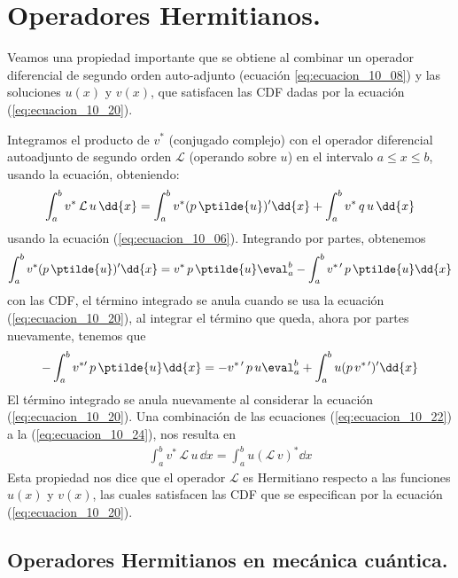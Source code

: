 \section{Operadores Hermitianos.}
Veamos una propiedad importante que se obtiene al combinar un operador diferencial de segundo orden auto-adjunto (ecuación \ref{eq:ecuacion_10_08}) y las soluciones $u(x)$ y $v(x)$, que satisfacen las CDF dadas por la ecuación (\ref{eq:ecuacion_10_20}).
\par
Integramos el producto de $v^{*}$ (conjugado complejo) con el operador diferencial autoadjunto de segundo orden $\mathcal{L}$ (operando sobre $u$) en el intervalo $a \leq x \leq b$, usando la ecuación, obteniendo:
\begin{align}
\int_{a}^{b} v^{*} \, \mathcal{L} \, u \, \dd{x} = \int_{a}^{b} v^{*} (p \, \ptilde{u})^{\prime} \dd{x} + \int_{a}^{b} v^{*} \, q \, u \, \dd{x}
\label{eq:ecuacion_10_22}
\end{align}
usando la ecuación (\ref{eq:ecuacion_10_06}). Integrando por partes, obtenemos
\begin{align}
\int_{a}^{b} v^{*}(p \, \ptilde{u})^{\prime} \dd{x} = v^{*} \, p \, \ptilde{u} \eval_{a}^{b} - \int_{a}^{b} v^{* \, \prime} \, p \, \ptilde{u} \dd{x}
\label{eq:ecuacion_10_23}
\end{align}
con las CDF, el término integrado se anula cuando se usa la ecuación (\ref{eq:ecuacion_10_20}), al integrar el término que queda, ahora por partes nuevamente, tenemos que
\begin{align}
- \int_{a}^{b} v^{* \prime} \, p \, \ptilde{u} \dd{x} = - v^{* \, \prime} \, p \, u \eval_{a}^{b} + \int_{a}^{b} u(p \, v^{* \, \prime})^{\prime} \dd{x}
\label{eq:ecuacion_10_24}
\end{align}
El término integrado se anula nuevamente al considerar la ecuación (\ref{eq:ecuacion_10_20}). Una combinación de las ecuaciones (\ref{eq:ecuacion_10_22}) a la (\ref{eq:ecuacion_10_24}), nos resulta en
\begin{align}
\int_{a}^{b} v^{*} \, \mathcal{L} \, u \, \dd{x} = \int_{a}^{b} u (\mathcal{L}  \, v)^{*} \dd{x}
\label{eq:ecuacion_10_25}
\end{align}
Esta propiedad nos dice que el operador $\mathcal{L}$ es Hermitiano respecto a las funciones $u(x)$ y $v(x)$, las cuales satisfacen las CDF que se especifican por la ecuación (\ref{eq:ecuacion_10_20}).
\subsection{Operadores Hermitianos en mecánica cuántica.}

